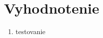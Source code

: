 
\chapter{Vyhodnotenie}\label{ch:evaluation}

\begin{enumerate}
   \item testovanie
\end{enumerate}

